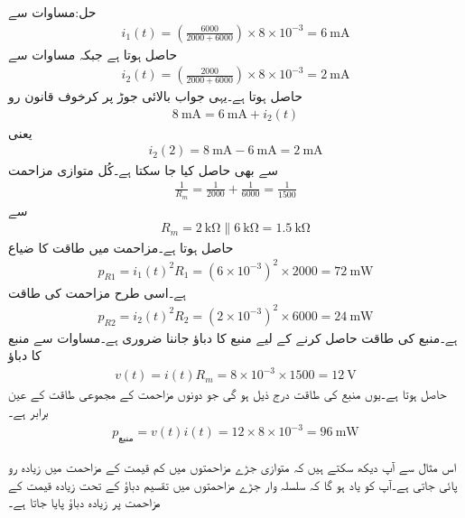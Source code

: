 حل:مساوات  سے
\begin{align*}
i_1(t)=\left(\frac{6000}{2000+6000}\right)  \times 8\times 10^{-3} =\SI{6}{\milli\ampere}
\end{align*}
حاصل ہوتا ہے جبکہ مساوات  سے
\begin{align*}
i_2(t)=\left(\frac{2000}{2000+6000}\right) \times 8\times 10^{-3}=\SI{2}{\milli\ampere}
\end{align*}
حاصل ہوتا ہے۔یہی جواب بالائی جوڑ پر کرخوف قانون رو
\begin{align*}
\SI{8}{\milli\ampere}=\SI{6}{\milli\ampere}+i_2(t)
\end{align*}
یعنی
\begin{align*}
i_2(2)=\SI{8}{\milli\ampere}-\SI{6}{\milli\ampere}=\SI{2}{\milli\ampere}
\end{align*}
سے بھی حاصل کیا جا سکتا ہے۔کُل متوازی مزاحمت
\begin{align*}
\frac{1}{R_m}=\frac{1}{2000}+\frac{1}{6000}=\frac{1}{1500}
\end{align*}
سے 
\begin{align*}
R_m=\SI{2}{\kilo\ohm} \parallel \SI{6}{\kilo\ohm}=\SI{1.5}{\kilo\ohm}
\end{align*}
حاصل ہوتا ہے۔مزاحمت  میں طاقت کا ضیاع
\begin{align*}
p_{R1}=i_1(t)^2 R_1=(6\times 10^{-3})^2  \times 2000=\SI{72}{\milli\watt}
\end{align*}
ہے۔اسی طرح مزاحمت  کی طاقت
\begin{align*}
p_{R2}=i_2(t)^2 R_2=(2\times 10^{-3})^2  \times 6000=\SI{24}{\milli\watt}
\end{align*}
ہے۔منبع کی طاقت حاصل کرنے کے لیے منبع کا دباؤ جاننا ضروری ہے۔مساوات  سے  منبع کا دباؤ
\begin{align*}
v(t)=i(t) R_m=8\times 10^{-3}\times 1500=\SI{12}{\volt} 
\end{align*}
حاصل ہوتا ہے۔یوں منبع کی طاقت درج ذیل ہو گی جو دونوں مزاحمت کے مجموعی طاقت کے  عین برابر ہے۔
\begin{align*}
p_{\text{منبع}}=v(t) i(t)=12\times 8\times 10^{-3}=\SI{96}{\milli\watt}
\end{align*}

اس مثال سے آپ دیکھ سکتے ہیں کہ متوازی جڑے مزاحمتوں میں کم قیمت کے مزاحمت میں زیادہ رو پائی جاتی ہے۔آپ کو یاد ہو گا کہ سلسلہ وار جڑے مزاحمتوں میں تقسیم دباؤ کے تحت زیادہ قیمت کے مزاحمت پر زیادہ دباؤ پایا جاتا ہے۔

